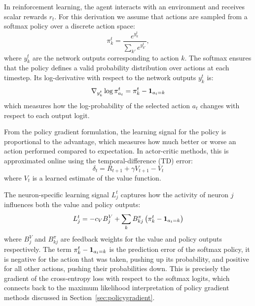 In reinforcement learning, the agent interacts with an environment and
receives scalar rewards $r_t$. For this derivation we assume that actions are sampled 
from a softmax policy over a discrete action space:
\begin{equation}
    \pi^t_k = \frac{e^{y^t_k}}{\sum_{k'} e^{y^t_{k'}}},
\end{equation}
where $y^t_k$ are the network outputs corresponding to action $k$. The
softmax ensures that the policy defines a valid probability distribution over
actions at each timestep. Its log-derivative with respect to the network 
outputs $y^t_k$ is:
\begin{equation}
    \nabla_{y^t_k} \log \pi^t_{a_t} = \pi^t_k - \mathbbm{1}_{a_t = k}
\end{equation}
which measures how the log-probability of the selected action $a_t$ changes 
with respect to each output logit.

From the policy gradient formulation, the learning signal for the policy is
proportional to the advantage, which measures how much better or worse an
action performed compared to expectation. In actor-critic methods, this
is approximated online using the temporal-difference (TD) error:
\begin{equation}
\delta_t = R_{t+1} + \gamma V_{t+1} - V_t
\end{equation}
where $V_t$ is a learned estimate of the value function.

The neuron-specific learning signal $L^t_j$ captures how the activity of
neuron $j$ influences both the value and policy outputs:
\begin{equation}
L^t_j
=
- c_V B^V_j
+
\sum_k B^\pi_{kj} \left(\pi^t_k - \mathbbm{1}_{a_t = k}\right)
\end{equation}
where $B^V_j$ and $B^\pi_{kj}$ are feedback weights for the value and policy
outputs respectively. The term $\pi^t_k - \mathbbm{1}_{a_t = k}$ is the
prediction error of the softmax policy, it is negative for the action that
was taken, pushing up its probability, and positive for all other actions,
pushing their probabilities down. This is precisely the gradient of the
cross-entropy loss with respect to the softmax logits, which connects back
to the maximum likelihood interpretation of policy gradient methods discussed
in Section~\ref{sec:policygradient}.

